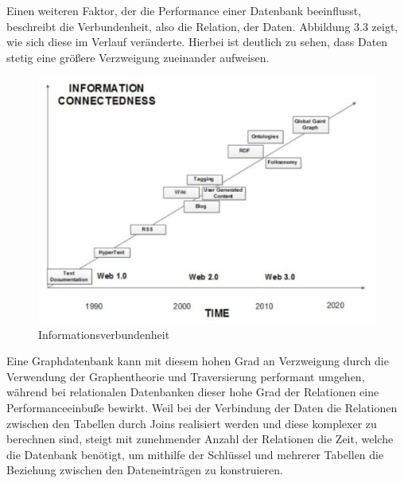 \noindent
Einen weiteren Faktor, der die Performance einer Datenbank beeinflusst, beschreibt die Verbundenheit, also die Relation, der Daten. Abbildung 3.3 zeigt, wie sich diese im Verlauf veränderte. Hierbei ist deutlich zu sehen, dass Daten stetig eine größere Verzweigung zueinander aufweisen.
\begin{figure}[H]
	\centering
	\includegraphics[scale=.45]{Illustrations/informationconnectedness.png}
	\caption{Informationsverbundenheit \citep{performancenosql}}
\end{figure}
\noindent
Eine Graphdatenbank kann mit diesem hohen Grad an Verzweigung durch die Verwendung der Graphentheorie und Traversierung performant umgehen, während bei relationalen Datenbanken dieser hohe Grad der Relationen eine Performanceeinbuße bewirkt. Weil bei der Verbindung der Daten die Relationen zwischen den Tabellen durch Joins realisiert werden und diese komplexer zu berechnen sind, steigt mit zunehmender Anzahl der Relationen die Zeit, welche die Datenbank benötigt, um mithilfe der Schlüssel und mehrerer Tabellen die Beziehung zwischen den Dateneinträgen zu konstruieren.  \citep{9677042} \citep{graphdb}

